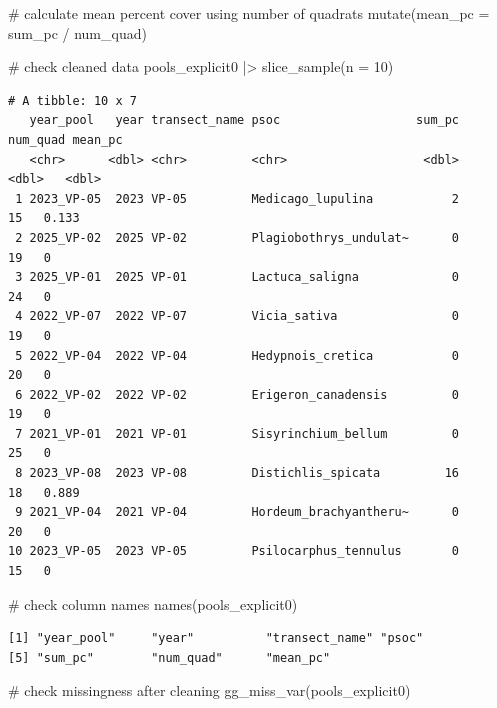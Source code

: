 \documentclass[
  letterpaper,
  DIV=11,
  numbers=noendperiod]{scrartcl}
\newenvironment{Shaded}{\begin{snugshade}}{\end{snugshade}}
\newcommand{\AttributeTok}[1]{\textcolor[rgb]{0.40,0.45,0.13}{#1}}
\newcommand{\CommentTok}[1]{\textcolor[rgb]{0.37,0.37,0.37}{#1}}
\newcommand{\DecValTok}[1]{\textcolor[rgb]{0.68,0.00,0.00}{#1}}
\newcommand{\FunctionTok}[1]{\textcolor[rgb]{0.28,0.35,0.67}{#1}}
\newcommand{\NormalTok}[1]{\textcolor[rgb]{0.00,0.23,0.31}{#1}}
\newcommand{\SpecialCharTok}[1]{\textcolor[rgb]{0.37,0.37,0.37}{#1}}
\begin{document}
\begin{Shaded}
\begin{Highlighting}[]
  \CommentTok{\# calculate mean percent cover using number of quadrats}
  \FunctionTok{mutate}\NormalTok{(}\AttributeTok{mean\_pc =}\NormalTok{ sum\_pc }\SpecialCharTok{/}\NormalTok{ num\_quad)}

\CommentTok{\# check cleaned data}
\NormalTok{pools\_explicit0 }\SpecialCharTok{|\textgreater{}}
  \FunctionTok{slice\_sample}\NormalTok{(}\AttributeTok{n =} \DecValTok{10}\NormalTok{)}
\end{Highlighting}
\end{Shaded}

\begin{verbatim}
# A tibble: 10 x 7
   year_pool   year transect_name psoc                   sum_pc num_quad mean_pc
   <chr>      <dbl> <chr>         <chr>                   <dbl>    <dbl>   <dbl>
 1 2023_VP-05  2023 VP-05         Medicago_lupulina           2       15   0.133
 2 2025_VP-02  2025 VP-02         Plagiobothrys_undulat~      0       19   0    
 3 2025_VP-01  2025 VP-01         Lactuca_saligna             0       24   0    
 4 2022_VP-07  2022 VP-07         Vicia_sativa                0       19   0    
 5 2022_VP-04  2022 VP-04         Hedypnois_cretica           0       20   0    
 6 2022_VP-02  2022 VP-02         Erigeron_canadensis         0       19   0    
 7 2021_VP-01  2021 VP-01         Sisyrinchium_bellum         0       25   0    
 8 2023_VP-08  2023 VP-08         Distichlis_spicata         16       18   0.889
 9 2021_VP-04  2021 VP-04         Hordeum_brachyantheru~      0       20   0    
10 2023_VP-05  2023 VP-05         Psilocarphus_tennulus       0       15   0    
\end{verbatim}

\begin{Shaded}
\begin{Highlighting}[]
\CommentTok{\# check column names}
\FunctionTok{names}\NormalTok{(pools\_explicit0)}
\end{Highlighting}
\end{Shaded}

\begin{verbatim}
[1] "year_pool"     "year"          "transect_name" "psoc"         
[5] "sum_pc"        "num_quad"      "mean_pc"      
\end{verbatim}

\begin{Shaded}
\begin{Highlighting}[]
\CommentTok{\# check missingness after cleaning}
\FunctionTok{gg\_miss\_var}\NormalTok{(pools\_explicit0)}
\end{Highlighting}
\end{Shaded}
\end{document}
